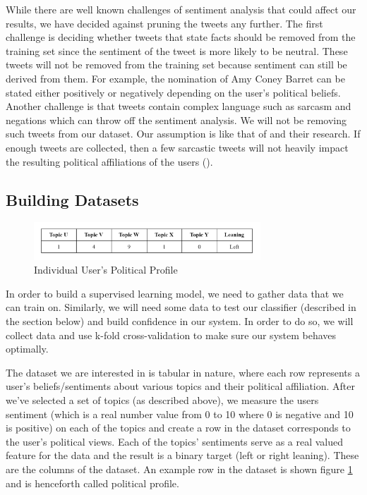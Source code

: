 \documentclass[letterpaper]{article} %
\begin{document}
While there are well known challenges of sentiment analysis that could affect our results, we have decided against pruning the tweets any further. The first challenge is deciding whether tweets that state facts should be removed from the training set since the sentiment of the tweet is more likely to be neutral. These tweets will not be removed from the training set because sentiment can still be derived from them. For example, the nomination of Amy Coney Barret can be stated either positively or negatively depending on the user’s political beliefs. Another challenge is that tweets contain complex language such as sarcasm and negations which can throw off the sentiment analysis. We will not be removing such tweets from our dataset. Our assumption is like that of \citeauthor{davidUtilizing} and their research. If enough tweets are collected, then a few sarcastic tweets will not heavily impact the resulting political affiliations of the users (\citeyear{davidUtilizing}). 

\subsection{Building Datasets}

\begin{figure}[t!]
\includegraphics[width=8.5cm]{figures/table_row.png}
\caption{Individual User's Political Profile}
\label{fig:row_example}
\end{figure}

In order to build a supervised learning model, we need to gather data that we can train on. Similarly, we will need some data to test our classifier (described in the section below) and build confidence in our system. In order to do so, we will collect data and use k-fold cross-validation to make sure our system behaves optimally.

The dataset we are interested in is tabular in nature, where each row represents a user’s beliefs/sentiments about various topics and their political affiliation. After we’ve selected a set of topics (as described above), we measure the users sentiment (which is a real number value from 0 to 10 where 0 is negative and 10 is positive) on each of the topics and create a row in the dataset corresponds to the user’s political views. Each of the topics' sentiments serve as a real valued feature for the data and the result is a binary target (left or right leaning). These are the columns of the dataset. An example row in the dataset is shown figure \ref{fig:row_example} and is henceforth called political profile.
\end{document}
